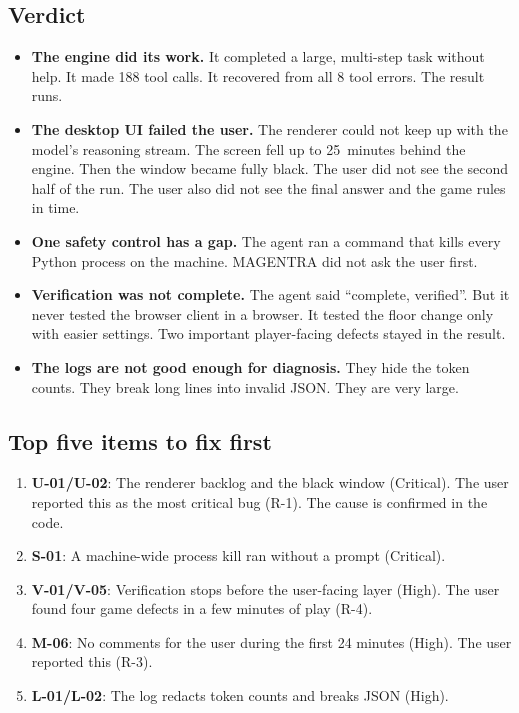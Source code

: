\documentclass[11pt,a4paper]{article}
\begin{document}
\subsection{Verdict}
\begin{itemize}
  \item \textbf{The engine did its work.} It completed a large, multi-step task
        without help. It made 188 tool calls. It recovered from all 8 tool errors.
        The result runs.
  \item \textbf{The desktop UI failed the user.} The renderer could not keep up
        with the model's reasoning stream. The screen fell up to 25~minutes behind
        the engine. Then the window became fully black. The user did not see the
        second half of the run. The user also did not see the final answer and the
        game rules in time.
  \item \textbf{One safety control has a gap.} The agent ran a command that kills
        every Python process on the machine. MAGENTRA did not ask the user first.
  \item \textbf{Verification was not complete.} The agent said ``complete,
        verified''. But it never tested the browser client in a browser. It
        tested the floor change only with easier settings. Two important
        player-facing defects stayed in the result.
  \item \textbf{The logs are not good enough for diagnosis.} They hide the token
        counts. They break long lines into invalid JSON. They are very large.
\end{itemize}

\subsection{Top five items to fix first}
\begin{enumerate}
  \item \textbf{U-01/U-02}: The renderer backlog and the black window (Critical).
        The user reported this as the most critical bug (R-1). The cause is
        confirmed in the code.
  \item \textbf{S-01}: A machine-wide process kill ran without a prompt (Critical).
  \item \textbf{V-01/V-05}: Verification stops before the user-facing layer
        (High). The user found four game defects in a few minutes of play (R-4).
  \item \textbf{M-06}: No comments for the user during the first 24 minutes
        (High). The user reported this (R-3).
  \item \textbf{L-01/L-02}: The log redacts token counts and breaks JSON (High).
\end{enumerate}
\end{document}
